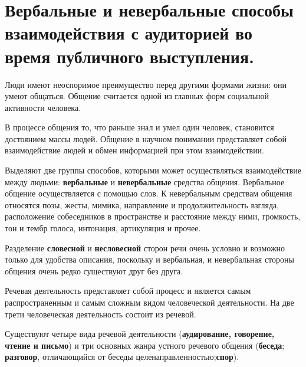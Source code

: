 \section{Вербальные и невербальные способы взаимодействия с аудиторией во время публичного выступления.}

\hspace{\parindent}Люди имеют неоспоримое преимущество перед другими формами жизни: они умеют общаться. 
Общение считается одной из главных форм социальной активности человека. 

 В процессе общения то, что раньше знал и умел один человек, становится достоянием массы
 людей. 
 Общение в научном понимании представляет собой взаимодействие людей и обмен
 информацией при этом взаимодействии.

 Выделяют две группы способов, которыми может осуществляться взаимодействие между людьми: \textbf{вербальные} и \textbf{невербальные} средства общения. Вербальное общение осуществляется с помощью слов. К невербальным средствам общения относятся позы, жесты, мимика, направление и продолжительность взгляда, расположение собеседников в пространстве и расстояние между ними, громкость, тон и тембр голоса, интонация,
 артикуляция и прочее.
 
 Разделение \textbf{словесной} и \textbf{несловесной} сторон речи очень условно и возможно только для удобства описания, поскольку и вербальная, и невербальная стороны общения очень редко существуют друг без друга.
 
 Речевая деятельность представляет собой процесс и является самым распространенным и самым сложным видом человеческой деятельности. На две трети человеческая деятельность
 состоит из речевой.

 Существуют четыре вида речевой деятельности (\textbf{аудирование, говорение, чтение и письмо}) и три основных жанра устного речевого общения (\textbf{беседа}; \textbf{разговор}, отличающийся от беседы целенаправленностью;\textbf{спор}).


